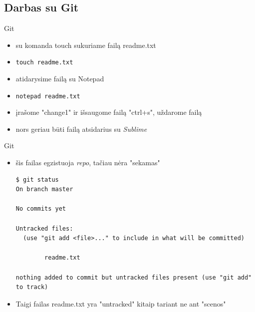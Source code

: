 \documentclass[11pt,xcolor=table]{beamer}
\begin{document}
\subsection{Darbas su Git}

\begin{frame}[fragile]{Git}
\begin{itemize}
\item su komanda touch sukuriame failą readme.txt
\item \colorbox{listinggray}{\lstinline|touch readme.txt|}
\item atidarysime failą su Notepad
\item \colorbox{listinggray}{\lstinline|notepad readme.txt|}
\item įrašome "change1" ir išsaugome failą "ctrl+s", uždarome failą
\item nors geriau būti failą atsidarius su \textit{Sublime}
\end{itemize}
\end{frame}


\begin{frame}[fragile]{Git}
\begin{itemize}
\item šis failas egzistuoja \textit{repo}, tačiau nėra "sekamas"
\begin{lstlisting}
$ git status
On branch master

No commits yet

Untracked files:
  (use "git add <file>..." to include in what will be committed)

        readme.txt

nothing added to commit but untracked files present (use "git add" to track)
\end{lstlisting}
\item Taigi failas readme.txt yra "untracked" kitaip tariant ne ant "scenos"
\end{itemize}
\end{frame}
\end{document}
